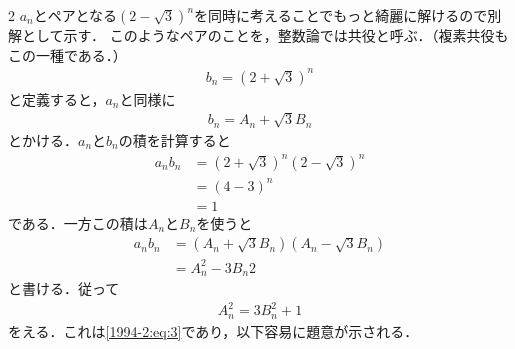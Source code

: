 \documentclass[../../main.tex]{subfiles}
\begin{document}
\begin{multicols}{2}
  $a_n$とペアとなる$(2-\sqrt{3})^n$を同時に考えることでもっと綺麗に解けるので別解として示す．
  このようなペアのことを，整数論では共役と呼ぶ．（複素共役もこの一種である．）
  \begin{align*}
    b_n = (2+\sqrt{3})^n
  \end{align*}
  と定義すると，$a_n$と同様に
  \begin{align*}
    b_n = A_n + \sqrt{3} B_n
  \end{align*}
  とかける．$a_n$と$b_n$の積を計算すると
  \begin{align*}
    a_nb_n
     & = (2+\sqrt{3})^n(2-\sqrt{3})^n \\
     & = \left(4-3\right)^n           \\
     & = 1
  \end{align*}
  である．一方この積は$A_n$と$B_n$を使うと
  \begin{align*}
    a_nb_n
     & = (A_n+\sqrt{3}B_n)(A_n-\sqrt{3}B_n) \\
     & = A_n^2 -3B_n2
  \end{align*}
  と書ける．従って
  \begin{align*}
    A_n^2 = 3B_n^2 +1
  \end{align*}
  をえる．これは\cref{1994-2:eq:3}であり，以下容易に題意が示される．

  \newpage
\end{multicols}
\end{document}
